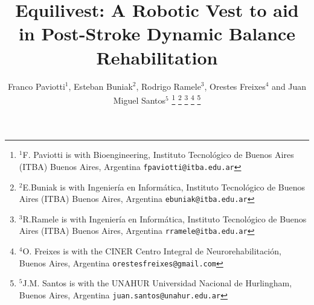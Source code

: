 \documentclass[conference]{IEEEtran}
\begin{document}
\title{Equilivest: A Robotic Vest to aid in Post-Stroke Dynamic Balance Rehabilitation
}

\author{%
Franco Paviotti$^{1}$, Esteban Buniak$^{2}$, Rodrigo Ramele$^{3}$, Orestes Freixes$^{4}$ and Juan Miguel Santos$^{5}$%
\thanks{$^{1}$F. Paviotti is with Bioengineering, Instituto Tecnológico de Buenos Aires (ITBA)
                    Buenos Aires, Argentina
        {\tt\small fpaviotti@itba.edu.ar}}%
\thanks{$^{2}$E.Buniak is with Ingeniería en Informática, Instituto Tecnológico de Buenos Aires (ITBA)
                    Buenos Aires, Argentina
        {\tt\small ebuniak@itba.edu.ar}}%
\thanks{$^{3}$R.Ramele is with Ingeniería en Informática, Instituto Tecnológico de Buenos Aires (ITBA)
                    Buenos Aires, Argentina
        {\tt\small rramele@itba.edu.ar}}%
\thanks{$^{4}$O. Freixes is with the CINER Centro Integral de Neurorehabilitación,
                    Buenos Aires, Argentina
        {\tt\small orestesfreixes@gmail.com}}%
\thanks{$^{5}$J.M. Santos is with the UNAHUR Universidad Nacional de Hurlingham,
                    Buenos Aires, Argentina
        {\tt\small juan.santos@unahur.edu.ar}}%
}

\end{document}
